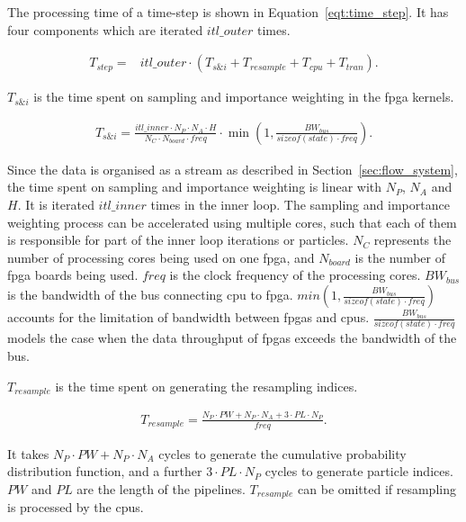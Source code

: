 The processing time of a time-step is shown in Equation~\ref{eqt:time_step}.
It has four components which are iterated $itl\_outer$ times.

\begin{equation}
\begin{aligned}
T_{step} = & itl\_outer \cdot \left (T_{s\&i} + T_{resample} + T_{cpu} + T_{tran} \right) \mbox{.}
\end{aligned}
\label{eqt:time_step}
\end{equation}
 
$T_{s\&i}$ is the time spent on sampling and importance weighting in the \gls{fpga} kernels.

\begin{equation}
\begin{aligned}
T_{s\&i} = \frac{itl\_inner \cdot N_P \cdot N_A \cdot H}{N_C \cdot N_{board} \cdot freq} \cdot \min\left(1,\frac{BW_{bus}}{sizeof(state) \cdot freq}\right) \mbox{.}
\end{aligned}
\end{equation}

Since the data is organised as a stream as described in Section~\ref{sec:flow_system}, the time spent on sampling and importance weighting is linear with $N_P$, $N_A$ and $H$.
It is iterated $itl\_inner$ times in the inner loop.
The sampling and importance weighting process can be accelerated using multiple cores, such that each of them is responsible for part of the inner loop iterations or particles.
$N_C$ represents the number of processing cores being used on one \gls{fpga}, and $N_{board}$ is the number of \gls{fpga} boards being used.
$freq$ is the clock frequency of the processing cores.
$BW_{bus}$ is the bandwidth of the bus connecting \gls{cpu} to \gls{fpga}.
$min(1,\frac{BW_{bus}}{sizeof(state) \cdot freq})$ accounts for the limitation of bandwidth between \glspl{fpga} and \glspl{cpu}.
$\frac{BW_{bus}}{sizeof(state) \cdot freq}$ models the case when the data throughput of \glspl{fpga} exceeds the bandwidth of the bus.

$T_{resample}$ is the time spent on generating the resampling indices.

\begin{equation}
\begin{aligned}
T_{resample} = \frac{N_P \cdot PW + N_P \cdot N_A + 3 \cdot PL \cdot N_P}{freq} \mbox{.}
\end{aligned}
\end{equation}

It takes $N_P \cdot PW + N_P \cdot N_A$ cycles to generate the cumulative probability distribution function, and a further $3 \cdot PL \cdot N_P$ cycles to generate particle indices.
$PW$ and $PL$ are the length of the pipelines.
$T_{resample}$ can be omitted if resampling is processed by the \glspl{cpu}.

